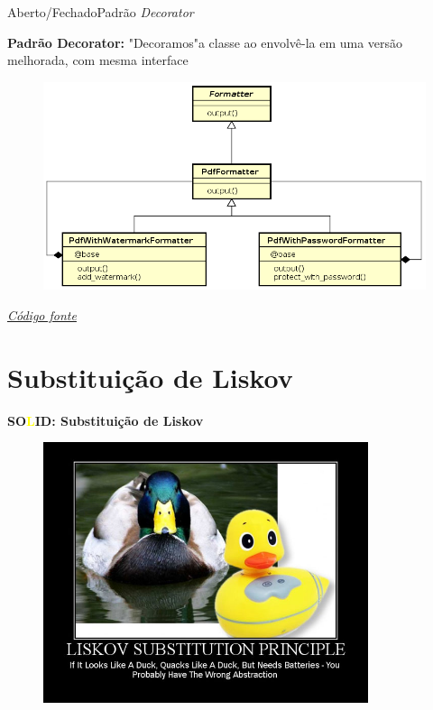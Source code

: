 \documentclass[10pt]{beamer}
\begin{document}

\begin{frame}{Aberto/Fechado}{Padrão \textit{Decorator}}

\textbf{Padrão Decorator:} "Decoramos"\space a classe ao envolvê-la em uma versão melhorada, com mesma interface

\begin{figure}
  \includegraphics[width=1.0\textwidth]{images/decoratorPattern.png}
\end{figure}

\hfill \space \hfill \small \textcolor{blue}{\href{http://pastebin.com/u8aYdwEL}{\textit{Código fonte}}}

\end{frame}

\section{Substituição de Liskov}

\begin{frame}{\textbf{SO\textcolor{yellow}{L}ID: Substituição de Liskov}}
	\begin{figure}[ht]
 		\centering
    	\includegraphics[width=0.85\textwidth, keepaspectratio=true]{images/LiskovSubstitution.jpg}
	\end{figure}
\end{frame}
\end{document}
